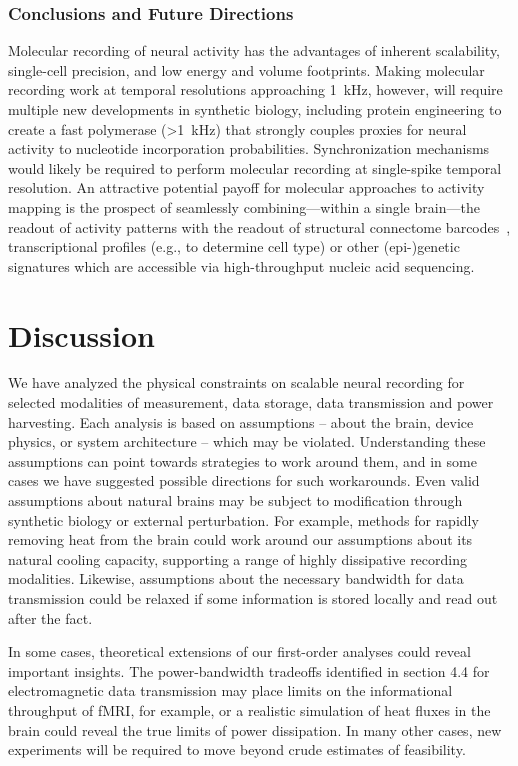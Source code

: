 \subsubsection{Conclusions and Future Directions}

Molecular recording of neural activity has the advantages of inherent scalability, single-cell precision, and low energy and volume footprints.
Making molecular recording work at temporal resolutions approaching \SI{1}{\kHz}, however, will require multiple new developments in synthetic biology, including protein engineering to create a fast polymerase (\SI{>1}{\kHz}) that strongly couples proxies for neural activity to nucleotide incorporation probabilities.
Synchronization mechanisms would likely be required to perform molecular recording at single-spike temporal resolution.
An attractive potential payoff for molecular approaches to activity mapping is the prospect of seamlessly combining---within a single brain---the readout of activity patterns with the readout of structural connectome barcodes~\cite{zador12, mishchenko2010optical}, transcriptional profiles \cite{Lee2013InSitu} (e.g., to determine cell type) or other (epi-)genetic signatures \cite{sanjana2012activity} which are accessible via high-throughput nucleic acid sequencing.

\section{Discussion}

We have analyzed the physical constraints on scalable neural recording for selected modalities of measurement, data storage, data transmission and power harvesting. Each analysis is based on assumptions -- about the brain, device physics, or system architecture -- which may be violated.
Understanding these assumptions can point towards strategies to work around them, and in some cases we have suggested possible directions for such workarounds.
Even valid assumptions about natural brains may be subject to modification through synthetic biology or external perturbation.
For example, methods for rapidly removing heat from the brain could work around our assumptions about its natural cooling capacity, supporting a range of highly dissipative recording modalities. Likewise, assumptions about the necessary bandwidth for data transmission could be relaxed if some information is stored locally and read out after the fact. 

In some cases, theoretical extensions of our first-order analyses could reveal important insights. The power-bandwidth tradeoffs identified in section 4.4 for electromagnetic data transmission may place limits on the informational throughput of fMRI, for example, or a realistic simulation of heat fluxes in the brain could reveal the true limits of power dissipation. In many other cases, new experiments will be required to move beyond crude estimates of feasibility.

